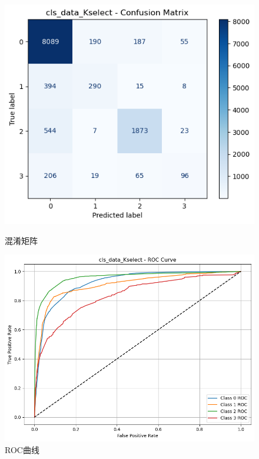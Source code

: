 \documentclass[10pt]{article}
\begin{document}
\begin{figure}[H]
\centering
\begin{minipage}[t]{0.45\textwidth}
  \centering
  \includegraphics[width=\linewidth]{cls_rf_10s.png}
  \caption{混淆矩阵}
  \label{fig:65}
\end{minipage}
\hfill
\begin{minipage}[t]{0.52\textwidth}
  \centering
  \includegraphics[width=\linewidth]{cls_rf_10s2.png}
  \caption{ROC曲线}
  \label{fig:66}
\end{minipage}
\end{figure}
\end{document}
